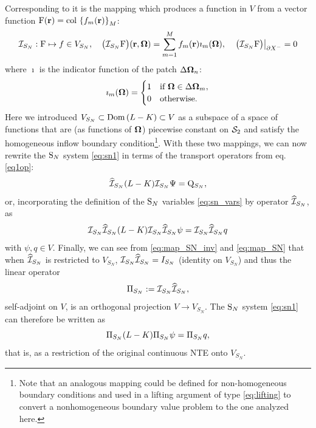 %
Corresponding to it is the mapping which produces a function in $V$ from a vector function 
\mbox{$\mathrm{F}(\br) = \colset{f_m(\br)}{\idxset{M}}$}:
\begin{equation}\label{eq:map_SN}
\PiSN: \mathrm{F} \mapsto f\in V_{S_N},\quad
\bigl(\PiSN \mathrm{F}\bigr)(\br,\bomega) = \sum_{m=1}^M f_m(\br)\imath_m(\bomega),\quad
\left.\bigl(\PiSN\mathrm{F}\bigr)\right\vert_{\pX[-]} = 0
\end{equation}
where $\imath$ is the indicator function of the patch $\Delta\bomega_n$:
\begin{equation}\label{eq:indicator}
\imath_m(\bomega) = \pw{1}{if $\bomega \in \Delta\bomega_m$}{0}{otherwise.}
\end{equation}
Here we introduced $V_{S_N}\subset\Dom{L-K} \subset V$ as a subspace of a space of functions that are (as functions of
$\bomega$) piecewise constant on $\Sphere$ and satisfy the homogeneous inflow boundary condition\footnote{Note that an
analogous mapping could be defined for non-homogeneous boundary conditions and used in a lifting argument of type \eqref{eq:lifting} to convert
a nonhomogeneous boundary value problem to the one analyzed here.}. With these two
mappings, we can now rewrite the $\SN$ system \eqref{eq:sn1} in terms of the transport operators from eq.
\eqref{eq1op}:
\begin{equation}\label{eq:sn_op}
	\PihSN (\op{L} - \op{K}) \PiSN \Psi = \mathrm{Q}_{S_N},
\end{equation}
or, incorporating the definition of the $\SN$ variables \eqref{eq:sn_vars} by operator $\PihSN$, as
\begin{equation}\label{eq:sn_op2}
	\PiSN \PihSN (\op{L} - \op{K})\PiSN \PihSN \psi = \PiSN \PihSN q
\end{equation} 
with $\psi, q \in V$. Finally, we can see from \eqref{eq:map_SN_inv} and \eqref{eq:map_SN} that when $\PihSN$ is
restricted to $V_{S_N}$, $\PiSN\PihSN = I_{S_N}$ (identity on $V_{S_N}$) and thus the linear operator
$$
	\Projop[S_N] := \PiSN\PihSN,
$$
self-adjoint on $V$, is an orthogonal projection $V\to V_{S_N}$. The $\SN$ system \eqref{eq:sn1} can
therefore be written as
\begin{equation}\label{eq:sn_op3}
	\Projop[S_N] (\op{L} - \op{K})\Projop[S_N] \psi = \Projop[S_N] q,
\end{equation}
that is, as a restriction of the original continuous NTE onto $V_{S_N}$. 

